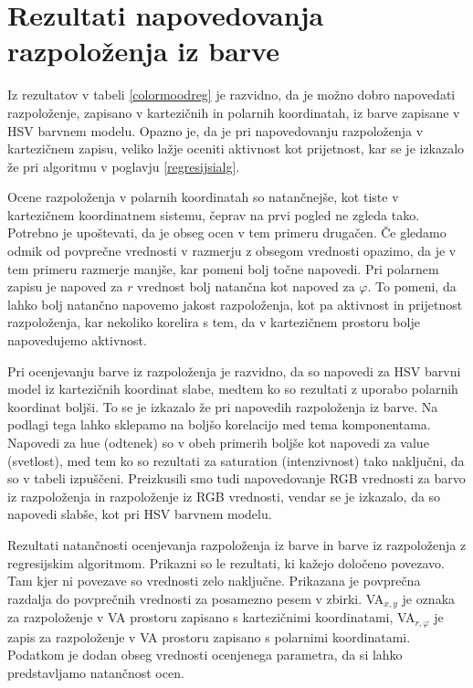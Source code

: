 \documentclass[a4paper, 12pt]{book}
\begin{document}
{\section{Rezultati napovedovanja razpoloženja iz barve}

Iz rezultatov v tabeli \ref{colormoodreg} je razvidno, da je možno dobro napovedati razpoloženje, zapisano v kartezičnih in polarnih koordinatah, iz barve zapisane v HSV barvnem modelu. Opazno je, da je pri napovedovanju razpoloženja v kartezičnem zapisu, veliko lažje oceniti aktivnost kot prijetnost, kar se je izkazalo že pri algoritmu v poglavju \ref{regresijsialg}. 

Ocene razpoloženja v polarnih koordinatah so natančnejše, kot tiste v kartezičnem koordinatnem sistemu, čeprav na prvi pogled ne zgleda tako. Potrebno je upoštevati, da je obseg ocen v tem primeru drugačen. Če gledamo odmik od povprečne vrednosti v razmerju z obsegom vrednosti opazimo, da je v tem primeru razmerje manjše, kar pomeni bolj točne napovedi. Pri polarnem zapisu je napoved za $r$ vrednost bolj natančna kot napoved za $\varphi$. To pomeni, da lahko bolj natančno napovemo jakost razpoloženja, kot pa aktivnost in prijetnost razpoloženja, kar nekoliko korelira s tem, da v kartezičnem prostoru bolje napovedujemo aktivnost.

Pri ocenjevanju barve iz razpoloženja je razvidno, da so napovedi za HSV barvni model iz kartezičnih koordinat slabe, medtem ko so rezultati z uporabo polarnih koordinat boljši. To se je izkazalo že pri napovedih razpoloženja iz barve. Na podlagi tega lahko sklepamo na boljšo korelacijo med tema komponentama. Napovedi za hue (odtenek) so v obeh primerih boljše kot napovedi za value (svetlost), med tem ko so rezultati za saturation (intenzivnost) tako naključni, da so v tabeli izpuščeni. Preizkusili smo tudi napovedovanje RGB vrednosti za barvo iz razpoloženja in razpoloženje iz RGB vrednosti, vendar se je izkazalo, da so napovedi slabše, kot pri HSV barvnem modelu.

\begin{table}[hbt]
\begin{center}

\caption{Rezultati natančnosti ocenjevanja razpoloženja iz barve in barve iz razpoloženja z regresijskim algoritmom. Prikazni so le rezultati, ki kažejo določeno povezavo. Tam kjer ni povezave so vrednosti zelo naključne. Prikazana je povprečna razdalja do povprečnih vrednosti za posamezno pesem v zbirki. VA$_{x,y}$ je oznaka za razpoloženje v VA prostoru zapisano s kartezičnimi koordinatami, VA$_{r,\varphi}$ je zapis za razpoloženje v VA prostoru zapisano s polarnimi koordinatami. Podatkom je dodan obseg vrednosti ocenjenega parametra, da si lahko predstavljamo natančnost ocen. }


\end{center}
\end{table}}
\end{document}
